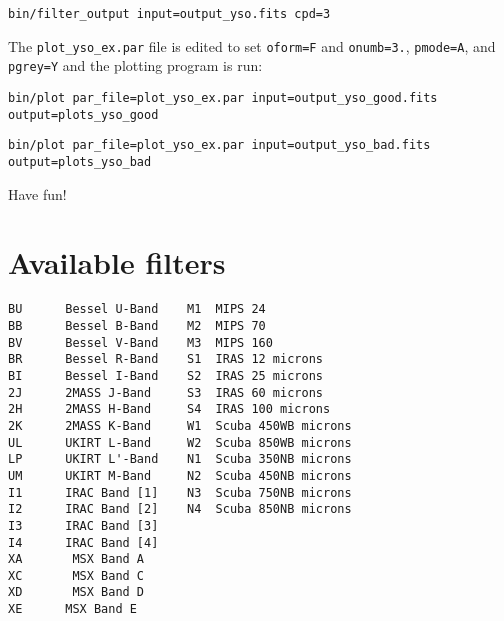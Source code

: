 \documentclass[letterpaper,11pt]{report}
\begin{document}
\begin{verbatim}
bin/filter_output input=output_yso.fits cpd=3
\end{verbatim}

The \texttt{plot\_yso\_ex.par} file is edited to set \texttt{oform=F} and \texttt{onumb=3.}, \texttt{pmode=A}, and \texttt{pgrey=Y} and the plotting program is run:

\begin{verbatim}
bin/plot par_file=plot_yso_ex.par input=output_yso_good.fits output=plots_yso_good
\end{verbatim}

\begin{verbatim}
bin/plot par_file=plot_yso_ex.par input=output_yso_bad.fits output=plots_yso_bad
\end{verbatim}

Have fun!

\appendix

\chapter{Available filters}
\label{sec:filt}
\begin{verbatim}
BU      Bessel U-Band    M1	 MIPS 24	    	   
BB      Bessel B-Band    M2	 MIPS 70	    	   
BV      Bessel V-Band    M3	 MIPS 160	    	   
BR      Bessel R-Band    S1	 IRAS 12 microns    	   
BI      Bessel I-Band    S2	 IRAS 25 microns    	    
2J      2MASS J-Band     S3	 IRAS 60 microns    	    
2H      2MASS H-Band     S4	 IRAS 100 microns   	    
2K      2MASS K-Band     W1	 Scuba 450WB microns		     
UL      UKIRT L-Band     W2	 Scuba 850WB microns
LP      UKIRT L'-Band    N1	 Scuba 350NB microns
UM      UKIRT M-Band     N2	 Scuba 450NB microns
I1      IRAC Band [1]    N3	 Scuba 750NB microns
I2      IRAC Band [2]    N4	 Scuba 850NB microns
I3      IRAC Band [3]
I4      IRAC Band [4]
XA	     MSX Band A
XC	     MSX Band C
XD	     MSX Band D
XE      MSX Band E
\end{verbatim}
\end{document}
